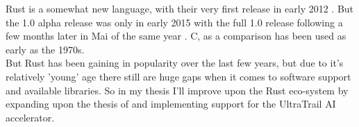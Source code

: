 
%

Rust \cite{rustlang} is a somewhat new language,
with their very first release in early 2012 \cite{rust_releases}.
But the 1.0 alpha release was only in early 2015 \cite{rust_releases}
with the full 1.0 release following a few months later in Mai of the same year \cite{rust_releases}.
C, as a comparison has been used as early as the 1970s.\\
But Rust has been gaining in popularity \cite{rust_popularity} over the last few years, but
due to it's relatively 'young' age there still are huge gaps when it comes to software support and available libraries.
So in my thesis I'll improve upon the Rust eco-system by expanding upon the thesis of 
and implementing support for the UltraTrail \cite{ultratrail} AI accelerator.
